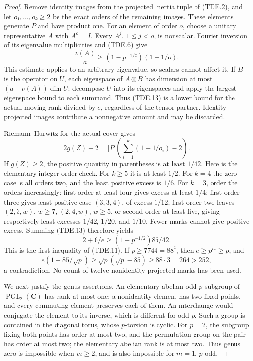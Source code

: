 \begin{proof}
Remove identity images from the projected inertia tuple of (TDE.2),
and let $o_1,\ldots,o_k\ge2$ be the exact orders of the remaining
images.  These elements generate $P$ and have product one.
For an element of order $o$, choose a unitary representative $A$
with $A^o=I$.  Every $A^j$, $1\le j<o$, is nonscalar.  Fourier
inversion of its eigenvalue multiplicities and (TDE.6) give
\[
 \frac{\nu(A)}a\ge(1-p^{-1/2})(1-1/o).
 \tag{TDE.13}
\]
This estimate applies to an arbitrary eigenvalue, so scalars cannot
affect it.  If $B$ is the operator on $U$, each eigenspace of $A\otimes B$
has dimension at most
$(a-\nu(A))\dim U$: decompose $U$ into its eigenspaces and apply
the largest-eigenspace bound to each summand.  Thus (TDE.13) is a
lower bound for the actual moving rank divided by $e$, regardless
of the tensor partner.  Identity projected images contribute a
nonnegative amount and may be discarded.

Riemann--Hurwitz for the actual cover gives
\[
       2g(Z)-2=|P|\left(\sum_{i=1}^k(1-1/o_i)-2\right).
       \tag{TDE.14}
\]
If $g(Z)\ge2$, the positive quantity in parentheses is at least
$1/42$.  Here is the elementary integer-order check.  For $k\ge5$
it is at least $1/2$.  For $k=4$ the zero case is all orders two,
and the least positive excess is $1/6$.  For $k=3$, order the
orders increasingly: first order at least four gives excess at
least $1/4$; first order three gives least positive case $(3,3,4)$,
of excess $1/12$; first order two leaves $(2,3,w)$, $w\ge7$,
$(2,4,w)$, $w\ge5$, or second order at least five, giving respectively
least excesses $1/42$, $1/20$, and $1/10$.  Fewer marks cannot
give positive excess.  Summing (TDE.13) therefore yields
\[
                  2+6/e\ge (1-p^{-1/2})85/42.
                  \tag{TDE.15}
\]
This is the first inequality of (TDE.11).  If $p\ge7744=88^2$,
then $e\ge p^m\ge p$, and
\[
 e(1-85/\sqrt p)\ge\sqrt p(\sqrt p-85)\ge88\cdot3=264>252,
 \tag{TDE.16}
\]
a contradiction.  No count of twelve nonidentity projected marks
has been used.

We next justify the genus assertions.  An elementary abelian odd
$p$-subgroup of $\operatorname{PGL}_2(\mathbf C)$ has rank at most
one: a nonidentity element has two fixed points, and every commuting
element preserves each of them.  An interchange would conjugate the
element to its inverse, which is different for odd $p$.  Such a group
is contained in the diagonal torus, whose $p$-torsion is cyclic.
For $p=2$, the subgroup fixing both points has order at most two,
and the permutation group on the pair has order at most two; the
elementary abelian rank is at most two.  Thus genus zero is impossible
when $m\ge2$, and is also impossible for $m=1$, $p$ odd.


\end{proof}
